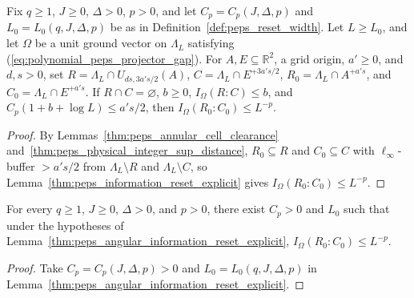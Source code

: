 \begin{lemma}
    \label{thm:peps_angular_information_reset_explicit}
    \leanok
    Fix $q\ge1$, $J\ge0$, $\Delta>0$, $p>0$, and let $C_p=C_p(J,\Delta,p)$ and
    $L_0=L_0(q,J,\Delta,p)$ be as in Definition~\ref{def:peps_reset_width}.
    Let $L\ge L_0$, and let $\Omega$ be a unit ground vector on $\Lambda_L$ satisfying (\ref{eq:polynomial_peps_projector_gap}).
    For $A,E\subseteq\mathbb R^2$, a grid origin, $a'\ge0$, and $d,s>0$, set
    $R=\Lambda_L\cap U_{ds,3a's/2}(A)$, $C=\Lambda_L\cap E^{+3a's/2}$,
    $R_0=\Lambda_L\cap A^{+a's}$, and $C_0=\Lambda_L\cap E^{+a's}$.
    If $R\cap C=\varnothing$, $b\ge0$, $I_\Omega(R:C)\le b$, and $C_p(1+b+\log L)\le a's/2$,
    then $I_\Omega(R_0:C_0)\le L^{-p}$.
\end{lemma}
\begin{proof}\leanok
    By Lemmas~\ref{thm:peps_annular_cell_clearance} and~\ref{thm:peps_physical_integer_sup_distance}, $R_0\subseteq R$ and $C_0\subseteq C$ with $\ell_\infty$-buffer $>a's/2$ from $\Lambda_L\setminus R$ and $\Lambda_L\setminus C$, so Lemma~\ref{thm:peps_information_reset_explicit} gives $I_\Omega(R_0:C_0)\le L^{-p}$.
\end{proof}

\begin{lemma}
    \label{thm:peps_angular_information_reset}
    \leanok
    For every $q\ge1$, $J\ge0$, $\Delta>0$, and $p>0$, there exist $C_p>0$ and $L_0$ such that under the hypotheses of Lemma~\ref{thm:peps_angular_information_reset_explicit}, $I_\Omega(R_0:C_0)\le L^{-p}$.
\end{lemma}
\begin{proof}\leanok
    Take $C_p=C_p(J,\Delta,p)>0$ and $L_0=L_0(q,J,\Delta,p)$ in
    Lemma~\ref{thm:peps_angular_information_reset_explicit}.
\end{proof}


